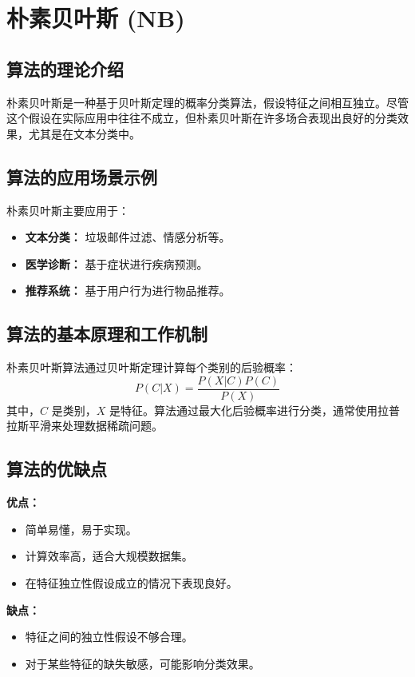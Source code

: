 \section{朴素贝叶斯 (NB)}
\subsection*{算法的理论介绍}
朴素贝叶斯是一种基于贝叶斯定理的概率分类算法，假设特征之间相互独立。尽管这个假设在实际应用中往往不成立，但朴素贝叶斯在许多场合表现出良好的分类效果，尤其是在文本分类中。

\subsection*{算法的应用场景示例}
朴素贝叶斯主要应用于：
\begin{itemize}
    \item \textbf{文本分类：} 垃圾邮件过滤、情感分析等。
    \item \textbf{医学诊断：} 基于症状进行疾病预测。
    \item \textbf{推荐系统：} 基于用户行为进行物品推荐。
\end{itemize}

\subsection*{算法的基本原理和工作机制}
朴素贝叶斯算法通过贝叶斯定理计算每个类别的后验概率：
\[
    P(C|X) = \frac{P(X|C)P(C)}{P(X)}
\]
其中，\(C\) 是类别，\(X\) 是特征。算法通过最大化后验概率进行分类，通常使用拉普拉斯平滑来处理数据稀疏问题。

\subsection*{算法的优缺点}
\textbf{优点：}
\begin{itemize}
    \item 简单易懂，易于实现。
    \item 计算效率高，适合大规模数据集。
    \item 在特征独立性假设成立的情况下表现良好。
\end{itemize}

\textbf{缺点：}
\begin{itemize}
    \item 特征之间的独立性假设不够合理。
    \item 对于某些特征的缺失敏感，可能影响分类效果。
\end{itemize}

